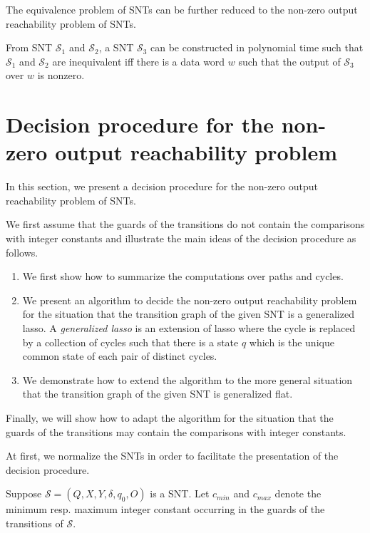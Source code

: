 \documentclass[runningheads,a4paper]{llncs}
\def\Ss{{\mathcal{S} }}
\begin{document}
The equivalence problem of SNTs can be further reduced to the non-zero output reachability problem of SNTs.

\begin{proposition}\label{prop-snt-eqv-to-nzero}
From SNT $\Ss_1$ and $\Ss_2$, a SNT $\Ss_3$ can be constructed in polynomial time such that $\Ss_1$ and $\Ss_2$ are  inequivalent iff there is a data word $w$ such that the output of $\Ss_3$ over $w$ is nonzero. 
\end{proposition}



\section{Decision procedure for the non-zero output reachability problem}\label{sec-dec-snt}

In this section, we present a decision procedure for the non-zero output reachability problem of SNTs. 

We first assume that the guards of the transitions do not contain the comparisons with integer constants and illustrate the main ideas of the decision procedure as follows.
\begin{enumerate}
\item  We first show how to summarize the computations over paths and cycles. 
%
\item We present an algorithm to decide the non-zero output reachability problem for the situation that the transition graph of the given SNT  is a generalized lasso. A \emph{generalized lasso} is an extension of lasso where the cycle is replaced by a collection of cycles such that there is a state $q$ which is the unique common state of each pair of distinct cycles.
%
\item We demonstrate how to extend the algorithm to the more general situation that the transition graph of the given SNT is generalized flat.
\end{enumerate}
Finally, we will show how to adapt the algorithm for the situation that the guards of the transitions may contain the comparisons with integer constants.

At first, we normalize the SNTs in order to facilitate the presentation of the decision procedure.

Suppose $\Ss=(Q,X,Y,\delta,q_0,O)$ is a SNT. Let $c_{min}$ and $c_{max}$ denote the minimum resp. maximum integer constant occurring in the guards of the transitions of $\Ss$. 
\end{document}
